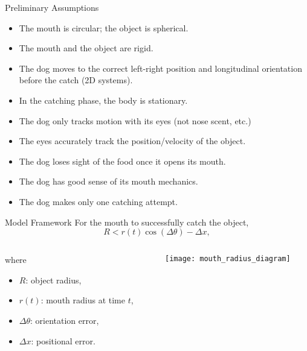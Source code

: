 \documentclass[compress,12pt,mp]{beamer}
\begin{document}
\begin{frame}[t]{Preliminary Assumptions} %
\begin{itemize}
    \item The mouth is circular; the object is spherical. %
    \item The mouth and the object are rigid.
    \item The dog moves to the correct left-right position and longitudinal orientation before the catch (2D systems).
    \item In the catching phase, the body is stationary. %
    \item The dog only tracks motion with its eyes (not nose scent, etc.)
    \item The eyes accurately track the position/velocity of the object.
    \item The dog loses sight of the food once it opens its mouth. %
    \item The dog has good sense of its mouth mechanics. %
    \item The dog makes only one catching attempt. 

\end{itemize}
\end{frame}
\begin{frame}[t]{Model Framework}
For the mouth to successfully catch the object,
    $$R<r(t)\cos(\Delta \theta)-\Delta x,$$
    \begin{columns}
    \begin{column}{0.5\linewidth}
    where
    \begin{itemize}
        \item $R$: object radius,
        \item $r(t)$: mouth radius at time $t$,
        \item $\Delta\theta$: orientation error,
        \item $\Delta x$: positional error.
    \end{itemize}
    \end{column}
    \begin{column}{0.5\linewidth}
        \texttt{[image: mouth\_radius\_diagram]}
    \end{column}
    \end{columns}
\end{frame}
\end{document}

